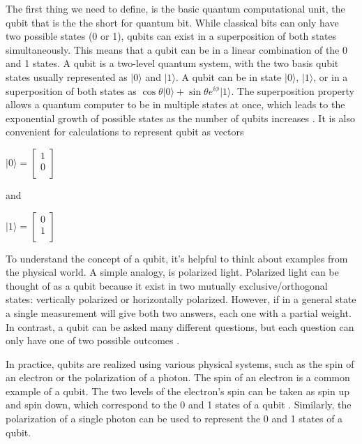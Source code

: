 \documentclass[inscr,ack,preface]{diphdthesis}
\begin{document}
The first thing we need to define, is the basic quantum computational unit, the \acrshort{qubit} that is the the short for quantum bit. 
 While classical bits can only have two possible states (0 or 1), \acrshort{qubit}s can exist in a superposition of both states simultaneously. This means that a \acrshort{qubit} can be in a linear combination of the 0 and 1 states. A \acrshort{qubit} is a two-level quantum system, with the two basis \acrshort{qubit} states usually represented as $\vert0\rangle$ and $\vert1\rangle$. A \acrshort{qubit} can be in state $\vert0\rangle$, $\vert1\rangle$, or in a superposition of both states as $\cos \theta\vert0\rangle+\sin\theta e^{i\phi} \vert1\rangle$. The superposition property allows a quantum computer to be in multiple states at once, which leads to the exponential growth of possible states as the number of \acrshort{qubit}s increases \cite{qubit}. It is also convenient for calculations to represent 
 \acrshort{qubit}  as vectors
 \begin{center}
 \Large
 $\vert0\rangle = 
    \begin{bmatrix}
    1 \\
    0 \\
    \end{bmatrix}$
\end{center}
\normalsize
and \\
\begin{center}
\Large
$\vert1\rangle = 
\begin{bmatrix}
0 \\
1 \\
\end{bmatrix}$
\end{center}
\normalsize
To understand the concept of a \acrshort{qubit}, it's helpful to think about examples from the physical world. A simple analogy, is polarized light. Polarized light can be thought of as a \acrshort{qubit} because it exist in two mutually exclusive/orthogonal states: vertically polarized or horizontally polarized. However, if in a general state a single measurement will give both two answers, each one with a partial weight. In contrast, a \acrshort{qubit} can be asked many different questions, but each question can only have one of two possible outcomes \cite{polarized}.

In practice, \acrshort{qubit}s are realized using various physical systems, such as the spin of an electron or the polarization of a photon. The spin of an electron is a common example of a \acrshort{qubit}. The two levels of the electron's spin can be taken as spin up and spin down, which correspond to the 0 and 1 states of a \acrshort{qubit} \cite{electron}. Similarly, the polarization of a single photon can be used to represent the 0 and 1 states of a \acrshort{qubit}.
\end{document}
